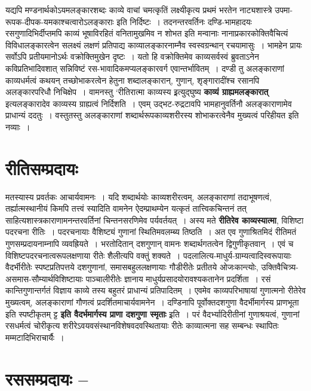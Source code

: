 {यद्यपि मण्डनार्थकोऽयमलङ्कारशब्दः काव्ये वाचां चमत्कृतिं लक्ष्यीकृत्य प्रथमं भरतेन नाट्यशास्त्रे उपमा-रूपक-दीपक-यमकाश्चत्वारोऽलङ्काराः इति निर्दिष्टः~। तदनन्तरवर्तिनः दण्डि-भामहादयः रसगुणादिभिर्दीप्तमपि काव्यं भूषाविरहितं वनितामुखमिव न शोभत इति मन्वानाः नानाप्रकारकोक्तिवैचित्यं विविधालङ्कारत्वेन सलक्ष्यं लक्षणं प्रतिपाद्य काव्यालङ्कारनाम्नैव स्वस्वग्रन्थान् रचयामासुः~। भामहेन प्रायः सर्वोऽपि प्रतीयमानोऽर्थः वक्रोक्तिमुखेन दृष्टः~। यतो हि वक्रोक्तिमेव काव्यसर्वस्वं ब्रुवताऽनेन कविप्रतिभादिवशात् सन्निविष्टं रस-भावादिकमप्यलङ्कारवर्ग एवान्तर्भावितम्~। दण्डी तु अलङ्काराणां काव्यधर्मत्वं कथयन् तच्छोभाकरत्वेन हेतुना शब्दालङ्कारान्, गुणान्, शृङ्गारादींश्च रसानपि अलङ्कारपरिधौ निचिक्षेप~। वामनस्तु ‘रीतिरात्मा काव्यस्य इ्रत्युद्घुष्य \textbf{काव्यं ग्राह्यमलङ्कारात्} इत्यलङ्कारादेव काव्यस्य ग्राह्यत्वं निर्दिशति~।   एवम् उद्भट-रुद्रटावपि भामहानुवर्तिनौ अलङ्काराणामेव प्राधान्यं ददतुः~। वस्तुतस्तु अलङ्काराणां शब्दार्थरूपकाव्यशरीरस्य  शोभाकरत्वेनैव मुख्यत्वं परिहीयत इति नव्याः~। 

\section*{ रीतिसम्प्रदायः}

मतस्यास्य प्रवर्तकः आचार्यवामनः~। यदि शब्दार्थयोः काव्यशरीरत्वम्, अलङ्काराणां तदाभूषणत्वं, तर्ह्यात्मस्थानीयं किमपि तत्त्वं स्यादिति वामनेन ऐदम्प्राथम्येन यत्कृतं तात्त्विकचिन्तनं तत् साहित्यशास्त्रकाराणामनन्तरवर्तिनां चिन्तनसरणिमेव पर्यवर्तयत्~। अस्य मते \textbf{रीतिरेव काव्यस्यात्मा}, विशिष्टा पदरचना रीतिः~। पदरचनायाः वैशिष्ट्यं गुणानां स्थितिमवलम्ब्य तिष्ठति~। अत एव गुणाश्रितमिदं रीतिमतं गुणसम्प्रदायनाम्नापि व्यवह्रियते~। भरतोदितान् दशगुणान् वामनः शब्दार्थगतत्वेन द्विगुणीकृतवान्~। एवं च विशिष्टपदरचनात्वरूपलक्षणाया रीतेः शैलीत्यपि वक्तुं शक्यते~। पदलालित्य-माधुर्य-ग्राम्यत्वादिस्वरूपायाः वैदर्भीरीतेः स्पष्टप्रतिपत्तये दशगुणानां, समासबहुललक्षणायाः गौडीरीतेः प्रतीतये ओजःकान्त्योः, उक्तिवैचित्र्य-असमास-सौम्यार्थविशिष्टायाः पाञ्चालीरीतेः ज्ञानाय माधुर्यप्रसादयोरावश्यकतानेन प्रदर्शिता~। रसं कान्तिगुणान्तर्गतं विज्ञाय काव्ये तस्य बहुतरं प्राधान्यं प्रतिपादितम्~। एवमेव काव्यपरिभाषायां गुणात्मनो रीतेरेव मुख्यत्वम्, अलङ्काराणां गौणत्वं प्रदर्शितमाचार्यवामनेन~। दण्डिनापि पूर्वोक्तदशगुणा वैदर्भीमार्गस्य प्राणभूता इति स्पष्टीकृतम् ट्ट \textbf{इति वैदर्भमार्गस्य प्राणा दशगुणा स्मृताः} इ्रति~। परं वैदर्भ्यादिरीतीनां गुणाश्रयत्वं, गुणानां रसधर्मत्वं चोरीकृत्य शरीरेऽवयवसंस्थानविशेषवदवस्थितायाः रीतेः काव्यात्मना सह सम्बन्धः स्थापितः मम्मटादिभिराचार्यैः~। 

\section*{ रससम्प्रदायः --}

}

